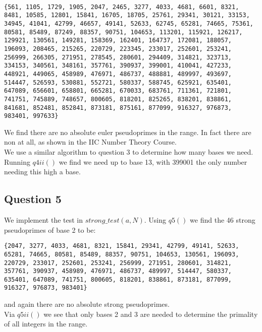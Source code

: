 \documentclass[10pt,a4paper]{report}
\begin{document}
\begin{lstlisting}[breaklines]

{561, 1105, 1729, 1905, 2047, 2465, 3277, 4033, 4681, 6601, 8321, 8481, 10585, 12801, 15841, 16705, 18705, 25761, 29341, 30121, 33153, 34945, 41041, 42799, 46657, 49141, 52633, 62745, 65281, 74665, 75361, 80581, 85489, 87249, 88357, 90751, 104653, 113201, 115921, 126217, 129921, 130561, 149281, 158369, 162401, 164737, 172081, 188057, 196093, 208465, 215265, 220729, 223345, 233017, 252601, 253241, 256999, 266305, 271951, 278545, 280601, 294409, 314821, 323713, 334153, 340561, 348161, 357761, 390937, 399001, 410041, 427233, 448921, 449065, 458989, 476971, 486737, 488881, 489997, 493697, 514447, 526593, 530881, 552721, 580337, 588745, 625921, 635401, 647089, 656601, 658801, 665281, 670033, 683761, 711361, 721801, 741751, 745889, 748657, 800605, 818201, 825265, 838201, 838861, 841681, 852481, 852841, 873181, 875161, 877099, 916327, 976873, 983401, 997633}

\end{lstlisting}

We find there are no absolute euler pseudoprimes in the range. In fact there are non at all, as shown in the IIC Number Theory Course.\\

We use a similar algorithm to question 3 to determine how many bases we need. Running $q4ii()$ we find we need  up to base 13, with 399001 the only number needing this high a base.

\subsection*{Question 5}

We implement the test in $strong\_test(a,N)$. Using $q5()$ we find the 46 strong pseudoprimes of base 2 to be:

\begin{lstlisting}[breaklines]
{2047, 3277, 4033, 4681, 8321, 15841, 29341, 42799, 49141, 52633, 65281, 74665, 80581, 85489, 88357, 90751, 104653, 130561, 196093, 220729, 233017, 252601, 253241, 256999, 271951, 280601, 314821, 357761, 390937, 458989, 476971, 486737, 489997, 514447, 580337, 635401, 647089, 741751, 800605, 818201, 838861, 873181, 877099, 916327, 976873, 983401}
\end{lstlisting}

and again there are no absolute strong pseudoprimes.\\

Via $q5ii()$ we see that only bases 2 and 3 are needed to determine the primality of all integers in the range.
\end{document}
